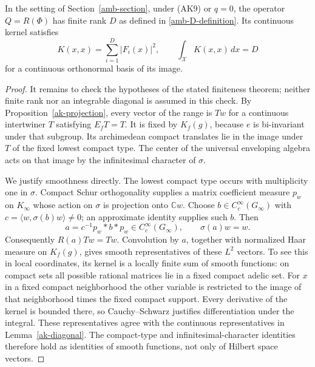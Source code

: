 \begin{theorem}\label{ak-finite-trace}
In the setting of Section~\ref{amb-section}, under (AK9)
or \(q=0\), the operator \(Q=R(\Phi)\) has finite rank
\(D\) as defined in \eqref{amb-D-definition}.
Its continuous kernel satisfies
\[
       K(x,x)=\sum_{i=1}^D|F_i(x)|^2,\qquad
                      \int_{\mathcal X}K(x,x)\,dx=D
 \tag{AK17}
\]
for a continuous orthonormal basis of its image.
\end{theorem}
\begin{proof}
It remains to check the hypotheses of the stated
finiteness theorem; neither finite rank nor an
integrable diagonal is assumed in this check.
By Proposition~\ref{ak-projection}, every vector
of the range is \(Tw\) for a continuous intertwiner
\(T\) satisfying \(E_fT=T\).
It is fixed by \(K_f(g)\), because \(e\) is
bi-invariant under that subgroup.
Its archimedean compact translates lie in the
image under \(T\) of the fixed lowest compact type.
The center of the universal enveloping algebra
acts on that image by the infinitesimal character
of \(\sigma\).

We justify smoothness directly.  The lowest compact
type occurs with multiplicity one in \(\sigma\).
Compact Schur orthogonality supplies a matrix
coefficient measure \(p_w\) on \(K_\infty\)
whose action on \(\sigma\) is projection onto
\(\mathbb Cw\).  Choose \(b\in C_c^\infty(G_\infty)\)
with \(c=\langle w,\sigma(b)w\rangle\ne0\);
an approximate identity supplies such \(b\).
Then
\[
                  a=c^{-1}p_w*b*p_w\in C_c^\infty(G_\infty),
                  \qquad \sigma(a)w=w.
\]
Consequently \(R(a)Tw=Tw\).
Convolution by \(a\), together with normalized Haar
measure on \(K_f(g)\), gives smooth representatives
of these \(L^2\) vectors.  To see this in local
coordinates, its kernel is a locally finite sum of
smooth functions: on compact sets all possible
rational matrices lie in a fixed compact adelic set.
For \(x\) in a fixed compact neighborhood the
other variable is restricted to the image of
that neighborhood times the fixed compact support.
Every derivative of the kernel is bounded there,
so Cauchy--Schwarz justifies differentiation under
the integral.  These representatives agree with
the continuous representatives in
Lemma~\ref{ak-diagonal}.
The compact-type and infinitesimal-character
identities therefore hold as identities of smooth
functions, not only of Hilbert space vectors.


\end{proof}
